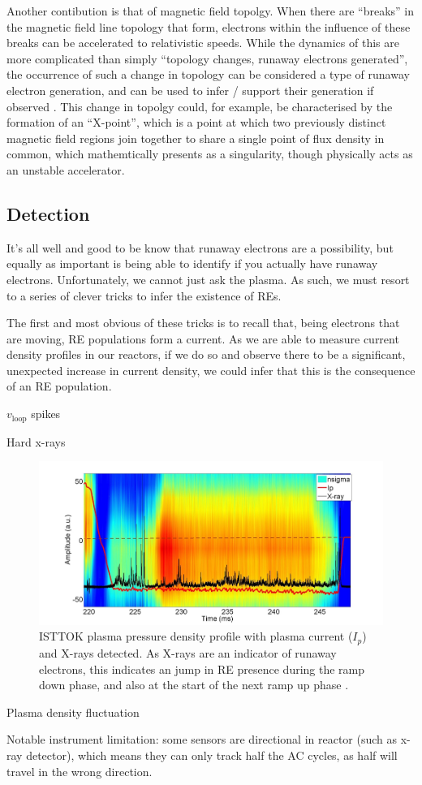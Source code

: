 Another contibution is that of magnetic field topolgy. When there are ``breaks'' in the magnetic field line topology that form, 
electrons within the influence of these breaks can be accelerated to relativistic speeds. While the dynamics of this are more 
complicated than simply ``topology changes, runaway electrons generated'', the occurrence of such a change in topology can be 
considered a type of runaway electron generation, and can be used to infer / support their generation if observed \cite{runaway-electrons}.
This change in topolgy could, for example, be characterised by the formation of an ``X-point'', which is a point at which two previously 
distinct magnetic field regions join together to share a single point of flux density in common, which mathemtically presents as 
a singularity, though physically acts as an unstable accelerator.


\subsection{Detection}

It's all well and good to be know that runaway electrons are a possibility, but equally as important is being able 
to identify if you actually have runaway electrons. Unfortunately, we cannot just ask the plasma. As such, we must resort 
to a series of clever tricks to infer the existence of REs. 

The first and most obvious of these tricks is to recall that, being electrons that are moving, RE populations form a current. As 
we are able to measure current density profiles in our reactors, if we do so and observe there to be a significant, unexpected increase in 
current density, we could infer that this is the consequence of an RE population. 

\todo

$v_{\text{loop}}$ spikes 

Hard x-rays 

\begin{figure}[h!]
    \centering
    \includegraphics[scale=0.9]{imgs/c2/re-presence.png}
    \caption{ISTTOK plasma pressure density profile with plasma current ($I_p$) and X-rays detected. As X-rays are 
    an indicator of runaway electrons, this indicates an jump in RE presence during the ramp down phase, and also 
    at the start of the next ramp up phase \cite{malaquias-matthew}.}
\end{figure}


Plasma density fluctuation

Notable instrument limitation: some sensors are directional in reactor (such as x-ray detector), which means 
they can only track half the AC cycles, as half will travel in the wrong direction.
